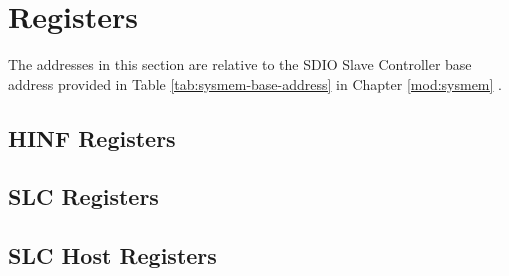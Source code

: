 \documentclass[main\_\_EN.tex]{subfiles}
\begin{document}

\clearpage
\section{Registers}

The addresses in this section are relative to the SDIO Slave Controller base address provided in Table \ref{tab:sysmem-base-address} in Chapter \ref{mod:sysmem} \textit{}.

\subsection{HINF Registers}
\label{sec:sdioslave-hinf-reg}



\subsection{SLC Registers}
\label{sec:sdioslave-slc-reg}



\subsection{SLC Host Registers}
\label{sec:sdioslave-slc-host-reg}


\end{document}
